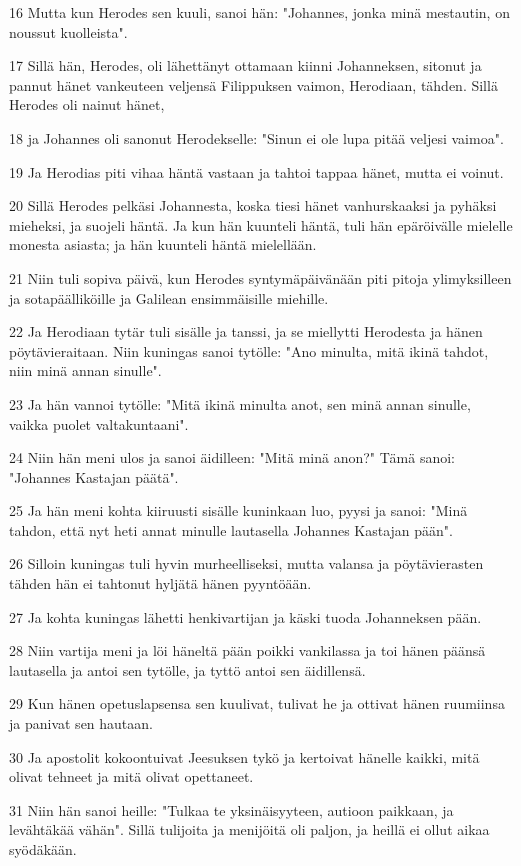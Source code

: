 \par 16 Mutta kun Herodes sen kuuli, sanoi hän: "Johannes, jonka minä mestautin, on noussut kuolleista".
\par 17 Sillä hän, Herodes, oli lähettänyt ottamaan kiinni Johanneksen, sitonut ja pannut hänet vankeuteen veljensä Filippuksen vaimon, Herodiaan, tähden. Sillä Herodes oli nainut hänet,
\par 18 ja Johannes oli sanonut Herodekselle: "Sinun ei ole lupa pitää veljesi vaimoa".
\par 19 Ja Herodias piti vihaa häntä vastaan ja tahtoi tappaa hänet, mutta ei voinut.
\par 20 Sillä Herodes pelkäsi Johannesta, koska tiesi hänet vanhurskaaksi ja pyhäksi mieheksi, ja suojeli häntä. Ja kun hän kuunteli häntä, tuli hän epäröivälle mielelle monesta asiasta; ja hän kuunteli häntä mielellään.
\par 21 Niin tuli sopiva päivä, kun Herodes syntymäpäivänään piti pitoja ylimyksilleen ja sotapäälliköille ja Galilean ensimmäisille miehille.
\par 22 Ja Herodiaan tytär tuli sisälle ja tanssi, ja se miellytti Herodesta ja hänen pöytävieraitaan. Niin kuningas sanoi tytölle: "Ano minulta, mitä ikinä tahdot, niin minä annan sinulle".
\par 23 Ja hän vannoi tytölle: "Mitä ikinä minulta anot, sen minä annan sinulle, vaikka puolet valtakuntaani".
\par 24 Niin hän meni ulos ja sanoi äidilleen: "Mitä minä anon?" Tämä sanoi: "Johannes Kastajan päätä".
\par 25 Ja hän meni kohta kiiruusti sisälle kuninkaan luo, pyysi ja sanoi: "Minä tahdon, että nyt heti annat minulle lautasella Johannes Kastajan pään".
\par 26 Silloin kuningas tuli hyvin murheelliseksi, mutta valansa ja pöytävierasten tähden hän ei tahtonut hyljätä hänen pyyntöään.
\par 27 Ja kohta kuningas lähetti henkivartijan ja käski tuoda Johanneksen pään.
\par 28 Niin vartija meni ja löi häneltä pään poikki vankilassa ja toi hänen päänsä lautasella ja antoi sen tytölle, ja tyttö antoi sen äidillensä.
\par 29 Kun hänen opetuslapsensa sen kuulivat, tulivat he ja ottivat hänen ruumiinsa ja panivat sen hautaan.
\par 30 Ja apostolit kokoontuivat Jeesuksen tykö ja kertoivat hänelle kaikki, mitä olivat tehneet ja mitä olivat opettaneet.
\par 31 Niin hän sanoi heille: "Tulkaa te yksinäisyyteen, autioon paikkaan, ja levähtäkää vähän". Sillä tulijoita ja menijöitä oli paljon, ja heillä ei ollut aikaa syödäkään.
